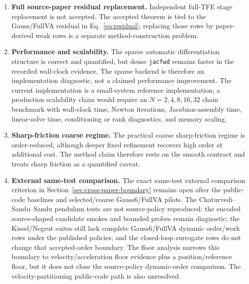 \documentclass[preprint,12pt]{elsarticle}
\newcommand{\method}{Gauss6\slash FullVA}
\newcommand{\tfe}{TFE}
\begin{document}
\begin{enumerate}
  lifted endpoint predictor lies in the strong local residual-inverse ball,
  the Newton iterates from any point of that ball stay in it, and the
  \(h^7\)-scaled stopping rule is met after $O(\log(1/h))$ iterations with
  constants depending only on the tube. P6 is nevertheless retained as a
  hypothesis: the Algorithm~1 predictor is not the lifted endpoint predictor
  and its ball membership is confirmed only a posteriori
  (Table~\ref{tab:predictor-check}), the reported production runs use a
  fixed tolerance rather than that rule, so they are covered only on
  transitions where the accepted residual meets the envelope, and the Neumann
  threshold $h_0$ is below the reported step sizes in every norm tried,
  because of the friction-law curvature. Discharging P6 would in any case
  address the solver-scale
  interface only; it would still not promote residual-only mechanism rows
  unless the separate P7 residual-to-error transfer theorem were also proved.
  \item \textbf{Full source-paper residual replacement.} Independent
  full-\tfe{} stage replacement is not accepted. The accepted theorem is tied
  to the Gauss/FullVA residual in Eq.~\eqref{eq:residual}; replacing those rows
  by paper-derived weak rows is a separate method-construction problem.
  \item \textbf{Performance and scalability.} The sparse automatic
  differentiation structure is correct and quantified, but dense
  \texttt{jacfwd} remains faster in the recorded wall-clock evidence. The
  sparse backend is therefore an implementation diagnostic, not a claimed
  performance improvement. The current implementation is a small-system
  reference implementation; a production scalability claim would require an
  $N=2,4,8,16,32$ chain benchmark with wall-clock time, Newton iterations,
  Jacobian-assembly time, linear-solve time, conditioning or rank diagnostics,
  and memory scaling.
  \item \textbf{Sharp-friction coarse regime.} The practical coarse
  sharp-friction regime is order-reduced, although deeper fixed refinement
  recovers high order at additional cost. The method claim therefore rests on
  the smooth contract and treats sharp friction as a quantified caveat.
  \item \textbf{External same-test comparison.} The exact same-test external
  comparison criterion in Section~\ref{sec:cross-paper-boundary} remains open
  after the public-code baselines and selected/coarse \method{} pilots.
  The Chaturvedi--Sandu--Sandu pendulum tests are not source-policy
  reproduced: the encoded source-shaped candidate smokes and bounded probes
  remain diagnostic; the Kissel/Negrut suites still lack complete \method{}
  dynamic order/work rows under the published policies; and the closed-loop
  surrogate rows do not change that accepted-order boundary. The floor
  analysis narrows this boundary to velocity/acceleration floor evidence plus
  a position/reference floor, but it does not close the source-policy
  dynamic-order comparison. The velocity-partitioning public-code path is also
  unresolved.
\end{enumerate}
\end{document}
